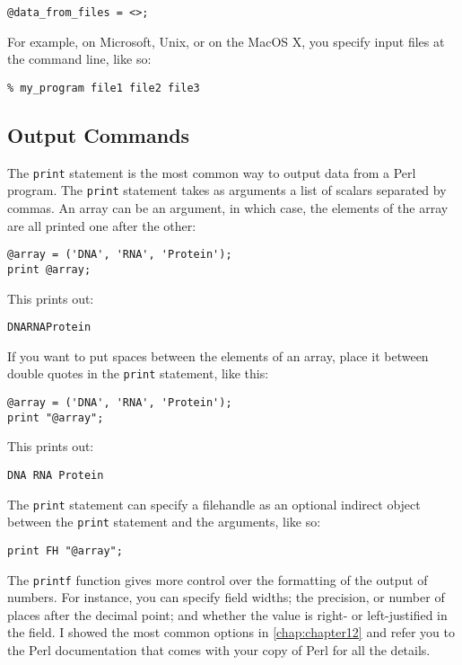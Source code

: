 \begin{lstlisting}
@data_from_files = <>;
\end{lstlisting}

For example, on Microsoft, Unix, or on the MacOS X, you specify input files at the command line, like so:

\begin{lstlisting}
% my_program file1 file2 file3
\end{lstlisting}

\subsection{Output Commands}
The \verb|print| statement is the most common way to output data from a Perl program. The \verb|print| statement takes as arguments a list of scalars separated by commas. An array can be an argument, in which case, the elements of the array are all printed one after the other:

\begin{lstlisting}
@array = ('DNA', 'RNA', 'Protein');
print @array;
\end{lstlisting}

This prints out:

\begin{lstlisting}
DNARNAProtein
\end{lstlisting}

If you want to put spaces between the elements of an array, place it between double quotes in the \verb|print| statement, like this:

\begin{lstlisting}
@array = ('DNA', 'RNA', 'Protein');
print "@array";
\end{lstlisting}

This prints out:

\begin{lstlisting}
DNA RNA Protein
\end{lstlisting}

The \verb|print| statement can specify a filehandle as an optional indirect object between the \verb|print| statement and the arguments, like so:

\begin{lstlisting}
print FH "@array";
\end{lstlisting}

The \verb|printf| function gives more control over the formatting of the output of numbers. For instance, you can specify field widths; the precision, or number of places after the decimal point; and whether the value is right- or left-justified in the field. I showed the most common options in \autoref{chap:chapter12} and refer you to the Perl documentation that comes with your copy of Perl for all the details.


